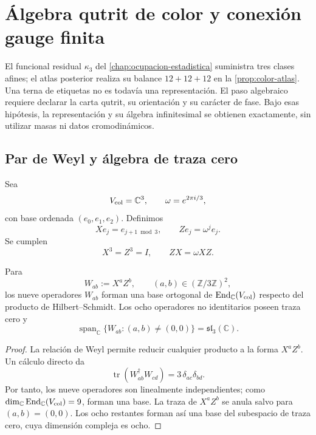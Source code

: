 \chapter{Álgebra qutrit de color y conexión gauge finita}
\label{chap:algebra-color-qutrit}

El funcional residual \(\kappa_3\) del
\cref{chap:ocupacion-estadistica} suministra tres clases afines; el atlas
posterior realiza su balance \(12+12+12\) en la
\cref{prop:color-atlas}. Una terna de etiquetas no es todavía una
representación. El paso algebraico requiere declarar la carta qutrit, su
orientación y su carácter de fase. Bajo esas hipótesis, la representación y
su álgebra infinitesimal se obtienen exactamente, sin utilizar masas ni datos
cromodinámicos.

\section{Par de Weyl y álgebra de traza cero}
\label{sec:weyl-color-qutrit}

Sea
\[
 V_{\rm col}=\mathbb C^3,
 \qquad
 \omega=e^{2\pi i/3},
\]
con base ordenada \((e_0,e_1,e_2)\). Definimos
\[
 Xe_j=e_{j+1\bmod3},
 \qquad
 Ze_j=\omega^j e_j.
\]
Se cumplen
\[
 X^3=Z^3=I,
 \qquad
 ZX=\omega XZ.
\]

\begin{theorem}
\label{thm:weyl-sl3-color}
Para
\[
 W_{ab}:=X^aZ^b,
 \qquad
 (a,b)\in(\mathbb Z/3\mathbb Z)^2,
\]
los nueve operadores \(W_{ab}\) forman una base ortogonal de
\(\operatorname{End}_{\mathbb C}(V_{\rm col})\) respecto del producto de
Hilbert--Schmidt. Los ocho operadores no identitarios poseen traza cero y
\[
 \operatorname{span}_{\mathbb C}
 \{W_{ab}:(a,b)\ne(0,0)\}
 =\mathfrak{sl}_3(\mathbb C).
\]
\end{theorem}

\begin{proof}
La relación de Weyl permite reducir cualquier producto a la forma
\(X^aZ^b\). Un cálculo directo da
\[
 \operatorname{tr}(W_{ab}^{\dagger}W_{cd})
 =3\,\delta_{ac}\delta_{bd}.
\]
Por tanto, los nueve operadores son linealmente independientes; como
\(\dim_{\mathbb C}\operatorname{End}_{\mathbb C}(V_{\rm col})=9\), forman una
base. La traza de \(X^aZ^b\) se anula salvo para
\((a,b)=(0,0)\). Los ocho restantes forman así una base del subespacio de
traza cero, cuya dimensión compleja es ocho.
\end{proof}

